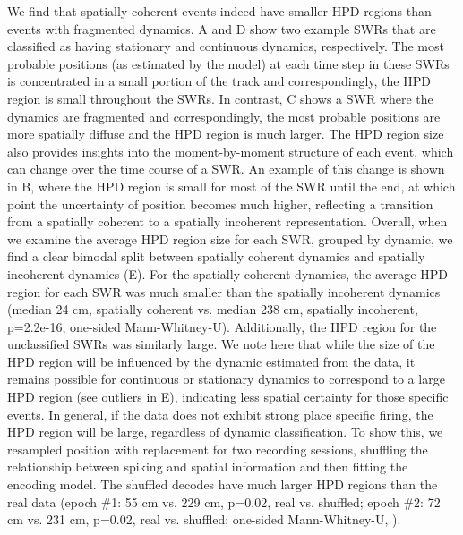 \documentclass[9pt,lineno]{elife}
\begin{document}
We find that spatially coherent events indeed have smaller HPD regions than events with fragmented dynamics. A and D show two example SWRs that are classified as having stationary and continuous dynamics, respectively. The most probable positions (as estimated by the model) at each time step in these SWRs is concentrated in a small portion of the track and correspondingly, the HPD region is small throughout the SWRs. In contrast, C shows a SWR where the dynamics are fragmented and correspondingly, the most probable positions are more spatially diffuse and the HPD region is much larger. The HPD region size also provides insights into the moment-by-moment structure of each event, which can change over the time course of a SWR. An example of this change is shown in B, where the HPD region is small for most of the SWR until the end, at which point the uncertainty of position becomes much higher, reflecting a transition from a spatially coherent to a spatially incoherent representation. Overall, when we examine the average HPD region size for each SWR, grouped by dynamic, we find a clear bimodal split between spatially coherent dynamics and spatially incoherent dynamics (E). For the spatially coherent dynamics, the average HPD region for each SWR was much smaller than the spatially incoherent dynamics (median 24 cm, spatially coherent vs. median 238 cm, spatially incoherent, p=2.2e-16, one-sided Mann-Whitney-U). Additionally, the HPD region for the unclassified SWRs was similarly large. We note here that while the size of the HPD region will be influenced by the dynamic estimated from the data, it remains possible for continuous or stationary dynamics to correspond to a large HPD region (see outliers in E), indicating less spatial certainty for those specific events. In general, if the data does not exhibit strong place specific firing, the HPD region will be large, regardless of dynamic classification. To show this, we resampled position with replacement for two recording sessions, shuffling the relationship between spiking and spatial information and then fitting the encoding model. The shuffled decodes have much larger HPD regions than the real data (epoch \#1: 55 cm vs. 229 cm, p=0.02, real vs. shuffled; epoch \#2: 72 cm vs. 231 cm, p=0.02, real vs. shuffled; one-sided Mann-Whitney-U, ).
\end{document}
